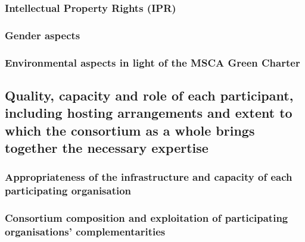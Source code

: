 \subsubsection{Intellectual Property Rights (IPR)}


\subsubsection{Gender aspects}
\label{sec:gender}


\subsubsection{Environmental aspects in light of the MSCA Green Charter}


\subsection{Quality, capacity and role of each participant, including hosting arrangements and extent to which the consortium as a whole brings together the necessary expertise}

\subsubsection{Appropriateness of the infrastructure and capacity of each participating
  organisation}


\subsubsection{Consortium composition and exploitation of participating
  organisations' complementarities}
\label{sec:composition}


